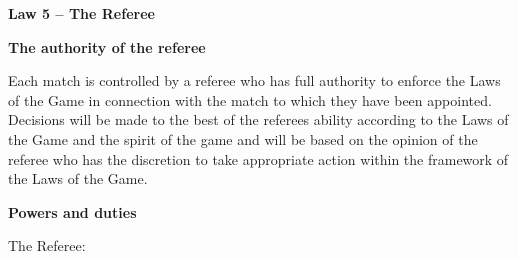 \clearpage
\sffamily
{\bfseries\color[rgb]{0.4,0.4,0.4}
Law 5 -- The Referee}
{}

\bigskip

{\bfseries The authority of the referee}

\headlinebox

Each match is controlled by a referee who has full authority to enforce the Laws
of the Game in connection with the match to which they have been appointed.
Decisions will be made to the best of the referees ability according to the Laws
of the Game and the spirit of the game and will be based on the opinion of the
referee who has the discretion to take appropriate action within the framework
of the Laws of the Game.

\bigskip

{\bfseries Powers and duties}

\headlinebox

The Referee:

